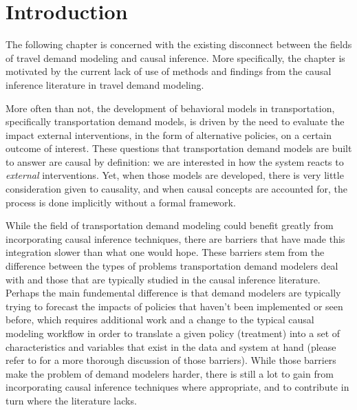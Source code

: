 \section{Introduction}
The following chapter is concerned with the existing disconnect between the 
fields of travel demand modeling and causal inference. 
More specifically, the chapter is motivated by the current lack of use of methods and findings from 
the causal inference literature in travel demand modeling. 

More often than not, the development of behavioral models in transportation, 
specifically transportation demand models, is driven by the need to evaluate 
the impact external interventions, in the form of alternative policies, on a 
certain outcome of interest. 
These questions that transportation demand models 
are built to answer are causal by definition: we are interested in how the 
system reacts to \textit{external} interventions. 
Yet, when those models are 
developed, there is very little consideration given to causality, and when 
causal concepts are accounted for, the process is done implicitly without a 
formal framework. 

While the field of transportation demand modeling could benefit greatly from 
incorporating causal inference techniques, there are barriers that have made 
this integration slower than what one would hope. 
These barriers stem from the difference between the types of problems transportation demand modelers deal with and those that are typically studied in the causal inference literature. 
Perhaps the main fundemental difference is that demand modelers 
are typically trying to forecast the impacts of policies that haven't been 
implemented or seen before, which requires additional work and a change to the
typical causal modeling workflow in order to translate a given policy 
(treatment) into a set of characteristics and variables that exist in the
data and system at hand (please refer to \citet{brathwaite_2018_causal} for a 
more thorough discussion of those barriers). 
While those barriers make the problem of demand modelers harder, there is still a lot to gain from 
incorporating causal inference techniques where appropriate, and to contribute
in turn where the literature lacks.  

